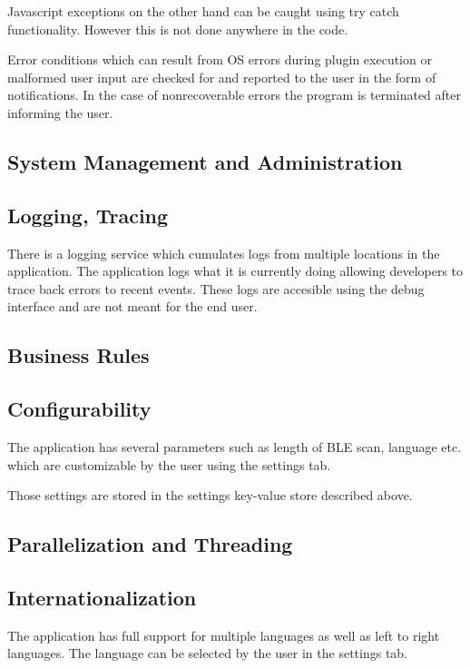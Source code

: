 \documentclass[]{article}
\begin{document}
Javascript exceptions on the other hand can be caught using try catch functionality. However this is not done anywhere in the code.

Error conditions which can result from OS errors during plugin execution or malformed user input are checked for and reported to the user in the form of notifications. In the case of nonrecoverable errors the program is terminated after informing the user.

\subsection{System Management and Administration}

\subsection{Logging, Tracing}

There is a logging service which cumulates logs from multiple locations in the application. The application logs what it is currently doing allowing developers to trace back errors to recent events. These logs are accesible using the debug interface and are not meant for the end user. 

\subsection{Business Rules}

\subsection{Configurability}

The application has several parameters such as length of BLE scan, language etc. which are customizable by the user using the settings tab. 

Those settings are stored in the settings key-value store described above.

\subsection{Parallelization and Threading}

\subsection{Internationalization}

The application has full support for multiple languages as well as left to right languages. The language can be selected by the user in the settings tab.
\end{document}
